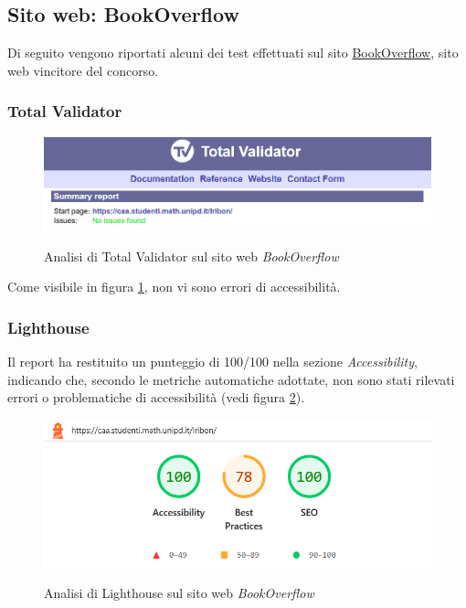 \subsection{Sito web: BookOverflow}
\noindent Di seguito vengono riportati alcuni dei test effettuati sul sito \href{https://caa.studenti.math.unipd.it/lribon/}{BookOverflow}, sito web vincitore del concorso.
\subsubsection{Total Validator}
\begin{figure}[H]
    \centering
    \includegraphics[width=0.8\linewidth, alt={Screenshot dell'analisi di Total Validator sul sito web BookOverflow}]{img/TV_bookoverflow.png}
    \caption{Analisi di Total Validator sul sito web \textit{BookOverflow}}\label{fig:TV_bookoverflow}
\end{figure}

\noindent Come visibile in figura \ref{fig:TV_bookoverflow}, non vi sono errori di accessibilità.

\subsubsection{Lighthouse}
\noindent Il report ha restituito un punteggio di 100/100 nella sezione \textit{Accessibility}, indicando che, secondo le metriche automatiche adottate, non sono stati rilevati errori o problematiche di accessibilità (vedi figura \ref{fig:Lighthouse_bookoverflow}).
\begin{figure}[H]
    \centering
    \includegraphics[width=0.6\linewidth, alt={Screenshot dell'analisi di Lighthouse sul sito web BookOverflow}]{img/Lighthouse_bookoverflow.png}
    \caption{Analisi di Lighthouse sul sito web \textit{BookOverflow}}\label{fig:Lighthouse_bookoverflow}
\end{figure}

